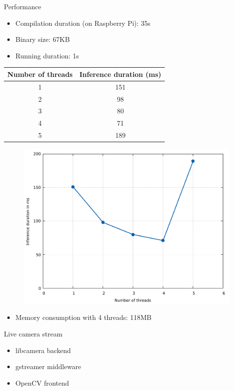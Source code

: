 \begin{frame}{Performance}
  \begin{itemize}
	\item Compilation duration (on Raspberry Pi): 35s
	\item Binary size: 67KB
	\item Running duration: 1s
  \end{itemize}
  \begin{table}
    {\tiny
	\begin{tabular}{|c|c|}
	  \hline
		\textbf{Number of threads} & \textbf{Inference duration (ms)} \\
	  \hline
		1 & 151 \\
	  \hline
		2 & 98 \\
	  \hline
		3 & 80 \\
	  \hline
		4 & 71 \\
	  \hline
		5 & 189 \\
	  \hline
	\end{tabular}
	}
  \end{table}
  \begin{figure}
	\includegraphics[width=\linewidth,height=0.45\textheight,keepaspectratio]{images/inference_duration_rps.pdf}
  \end{figure}
  \begin{itemize}
	\item Memory consumption with 4 threads: 118MB
  \end{itemize}
\end{frame}

\begin{frame}{Live camera stream}
  \begin{itemize}
	\item libcamera backend
	\item gstreamer middleware
	\item OpenCV frontend
  \end{itemize}
\end{frame}


